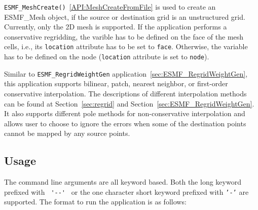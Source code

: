 {\tt ESMF\_MeshCreate()}~\ref{API:MeshCreateFromFile} is used to create an ESMF\_Mesh object, if the
source or destination grid is an unstructured grid. Currently, only the 2D mesh is supported.
If the application performs a conservative regridding, the varible has to be defined on the face of the mesh cells, i.e., its {\tt location} attribute has to be set to {\tt face}.  Otherwise, the variable has to be 
defined on the node ({\tt location} attribute is set to {\tt node}).

Similar to {\tt ESMF\_RegridWeightGen} application~\ref{sec:ESMF_RegridWeightGen}, this application supports
bilinear, patch, nearest neighbor, or first-order conservative interpolation. The descriptions of different 
interpolation methods can be found at Section~\ref{sec:regrid} and Section~\ref{sec:ESMF_RegridWeightGen}. 
It also supports different pole methods for non-conservative interpolation and allows user to choose to 
ignore the errors when some of the destination points cannot be mapped by any source points. 

\subsection{Usage}\label{sec:fileregridusage}

The command line arguments are all keyword based.  Both the long keyword prefixed with \verb+ '--' + or the
one character short keyword prefixed with {\tt '-'} are supported.  The format to run the application is
as follows:

